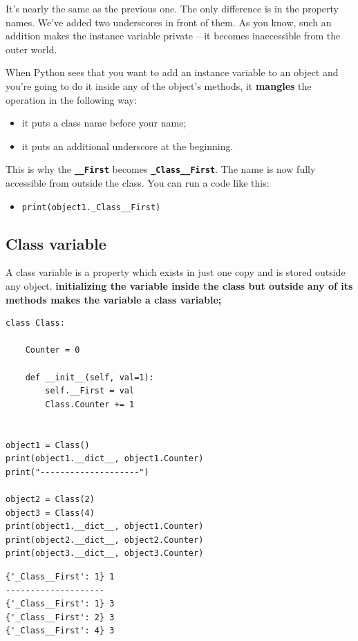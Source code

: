 \documentclass[11pt]{article}
\begin{document}
It’s nearly the same as the previous one. The only difference is in
the property names. We’ve added two underscores in front of them. As
you know, such an addition makes the instance variable private – it
becomes inaccessible from the outer world.

When Python sees that you want to add an instance variable to an
object and you’re going to do it inside any of the object’s methods,
it \textbf{mangles} the operation in the following way:
\begin{itemize}
\item it puts a class name before your name;
\item it puts an additional underscore at the beginning.
\end{itemize}

This is why the \textbf{\texttt{\_\_First}} becomes \textbf{\texttt{\_Class\_\_First}}. The name is now fully
accessible from outside the class. You can run a code like this:
\begin{itemize}
\item \texttt{print(object1.\_Class\_\_First)}

\newpage
\end{itemize}

\subsection{Class variable}
\label{sec:org4583763}
A class variable is a property which exists in just one copy and is
stored outside any object. \textbf{initializing the variable inside the class
but outside any of its methods makes the variable a class variable;}

\begin{verbatim}
class Class:

	Counter = 0

	def __init__(self, val=1):
		self.__First = val
		Class.Counter += 1


object1 = Class()
print(object1.__dict__, object1.Counter)
print("--------------------")

object2 = Class(2)
object3 = Class(4)
print(object1.__dict__, object1.Counter)
print(object2.__dict__, object2.Counter)
print(object3.__dict__, object3.Counter)

\end{verbatim}

\begin{verbatim}
{'_Class__First': 1} 1
--------------------
{'_Class__First': 1} 3
{'_Class__First': 2} 3
{'_Class__First': 4} 3
\end{verbatim}
\end{document}
